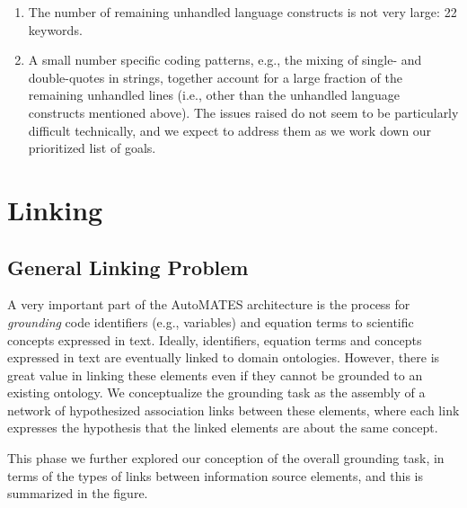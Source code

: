 \documentclass[article, 12pt, oneside]{memoir}
\begin{document}
\begin{enumerate}
\def\labelenumi{\arabic{enumi}.}
\item
  The number of remaining unhandled language constructs is not very
  large: 22 keywords.
\item
  A small number specific coding patterns, e.g., the mixing of single-
  and double-quotes in strings, together account for a large fraction of
  the remaining unhandled lines (i.e., other than the unhandled language
  constructs mentioned above). The issues raised do not seem to be
  particularly difficult technically, and we expect to address them as
  we work down our prioritized list of goals.
\end{enumerate}

\hypertarget{linking}{%
\section{Linking}\label{linking}}

\hypertarget{general-linking-problem}{%
\subsection{General Linking Problem}\label{general-linking-problem}}

A very important part of the AutoMATES architecture is the process for
\emph{grounding} code identifiers (e.g., variables) and equation terms
to scientific concepts expressed in text. Ideally, identifiers, equation
terms and concepts expressed in text are eventually linked to domain
ontologies. However, there is great value in linking these elements even
if they cannot be grounded to an existing ontology. We conceptualize the
grounding task as the assembly of a network of hypothesized association
links between these elements, where each link expresses the hypothesis
that the linked elements are about the same concept.

This phase we further explored our conception of the overall grounding
task, in terms of the types of links between information source
elements, and this is summarized in the figure.
\end{document}
